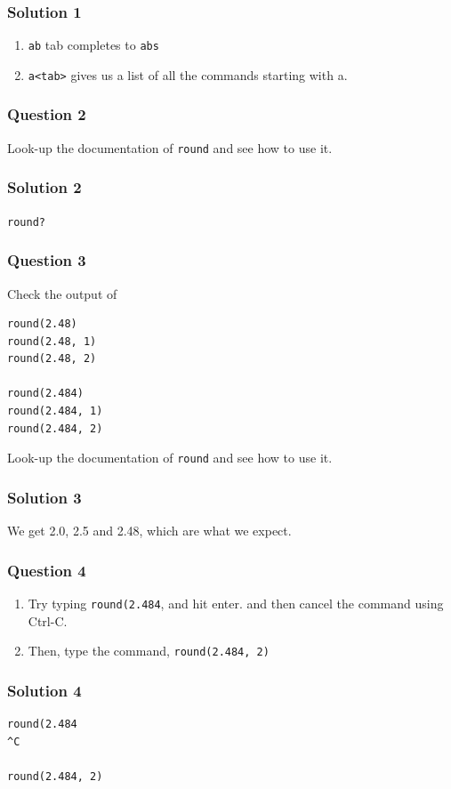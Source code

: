 \documentclass[presentation]{beamer}
\begin{document}
\begin{frame}
\frametitle{Solution 1}
\label{sec-3}
\begin{enumerate}
\item \texttt{ab} tab completes to \texttt{abs}
\item \texttt{a<tab>} gives us a list of all the commands starting
  with a.
\end{enumerate}
\end{frame}

\begin{frame}
\frametitle{Question 2}
\label{sec-4}

  Look-up the documentation of \texttt{round} and see how to use it.
\end{frame}
\begin{frame}
\frametitle{Solution 2}
\label{sec-5}

  \texttt{round?}
\end{frame}
\begin{frame}[fragile]
\frametitle{Question 3}
\label{sec-6}

  Check the output of
\begin{verbatim}
round(2.48)
round(2.48, 1)
round(2.48, 2)

round(2.484)
round(2.484, 1)
round(2.484, 2)
\end{verbatim}
  Look-up the documentation of \texttt{round} and see how to use it.
\end{frame}
\begin{frame}
\frametitle{Solution 3}
\label{sec-7}

  We get 2.0, 2.5 and 2.48, which are what we expect. 
\end{frame}
\begin{frame}
\frametitle{Question 4}
\label{sec-8}
\begin{enumerate}
\item Try typing \texttt{round(2.484}, and hit enter. and then cancel
  the command using Ctrl-C.
\item Then, type the command, \texttt{round(2.484, 2)} 
\end{enumerate}
\end{frame}
\begin{frame}[fragile]
\frametitle{Solution 4}
\label{sec-9}

\begin{verbatim}
round(2.484 
^C

round(2.484, 2)
\end{verbatim}
\end{frame}
\end{document}
